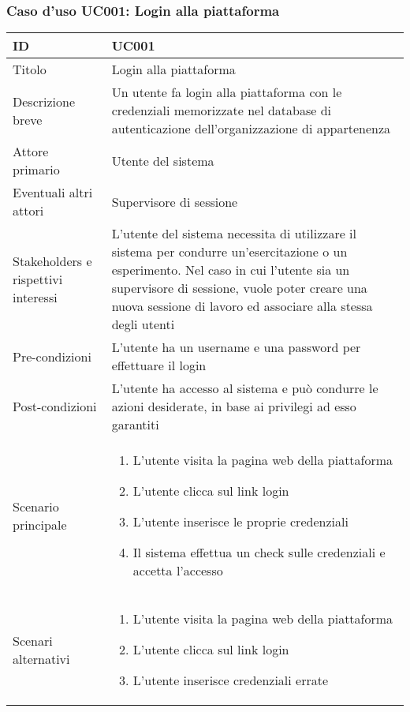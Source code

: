 \documentclass[../../main.tex]{subfiles}
\begin{document}
\subsubsection{Caso d’uso UC001: Login alla piattaforma }
\begin{tabularx}{150mm}{|l|X|}
    \hline
    ID                                  & \textbf{UC001}\\
    \hline
    Titolo                              & Login alla piattaforma \\
    \hline
    Descrizione breve                   & Un utente fa login alla piattaforma con le credenziali memorizzate nel database di autenticazione dell'organizzazione di appartenenza   \\
    \hline
    Attore primario                     & Utente del sistema   \\
    \hline
    Eventuali altri attori              & Supervisore di sessione   \\
    \hline
    Stakeholders e rispettivi interessi & L'utente del sistema necessita di utilizzare il sistema per condurre un'esercitazione o un esperimento. Nel caso in cui l'utente sia un supervisore di sessione, vuole poter creare una nuova sessione di lavoro ed associare alla stessa degli utenti   \\
    \hline
    Pre-condizioni                      & L'utente ha un username e una password per effettuare il login   \\
    \hline
    Post-condizioni                     & L'utente ha accesso al sistema e può condurre le azioni desiderate, in base ai privilegi ad esso garantiti   \\
    \hline
    Scenario principale                 & \begin {enumerate}
\item {L'utente visita la pagina web della piattaforma}
\item {L'utente clicca sul link login}
\item {L'utente inserisce le proprie credenziali}
\item {Il sistema effettua un check sulle credenziali e accetta l'accesso}
    \end{enumerate}
    \\
    \hline
    Scenari alternativi                 &
    \begin {enumerate}
\item{L'utente visita la pagina web della piattaforma}
\item{L'utente clicca sul link login}
\item{L'utente inserisce credenziali errate}

\end{enumerate}
\end{tabularx}
\end{document}
